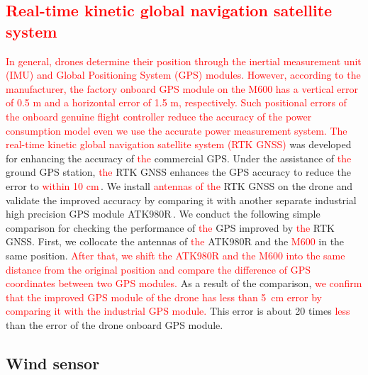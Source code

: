 \documentclass[journal]{./template/IEEEtran}
\begin{document}
\label{Section: Design the power measurement board}





\subsection{\textcolor{red}{Real-time kinetic global navigation satellite system}}
\textcolor{red}{In general, drones determine their position through the inertial measurement unit (IMU) and Global Positioning System (GPS) modules. 
However, according to the manufacturer, the factory onboard GPS module on the M600 has a vertical error of 0.5 m and a horizontal error of 1.5 m, respectively. 
Such positional errors of the onboard genuine flight controller reduce the accuracy of the power consumption model even we use the accurate power measurement system.}
\textcolor{red}{The real-time kinetic global navigation satellite system (RTK GNSS)} was developed for enhancing the accuracy of \textcolor{red}{the} commercial GPS.
Under the assistance of \textcolor{red}{the} ground GPS station, \textcolor{red}{the} RTK GNSS enhances the GPS accuracy to reduce the error to \textcolor{red}{within 10 cm}\,\cite{ref_13}.
We install \textcolor{red}{antennas of the} RTK GNSS on the drone and validate the improved accuracy by comparing it with another separate industrial high precision GPS module ATK980R\,\cite{ref_14}.
We conduct the following simple comparison for checking the performance of \textcolor{red}{the} GPS improved by \textcolor{red}{the} RTK GNSS.
First, we collocate the antennas of \textcolor{red}{the} ATK980R and the \textcolor{red}{M600} in the same position. 
\textcolor{red}{After that, we shift the ATK980R and the M600 into the same distance from the original position and compare the difference of GPS coordinates between two GPS modules.}
As a result of the comparison, \textcolor{red}{we confirm that the improved GPS module of the drone has less than 5~cm error by comparing it with the industrial GPS module.}
This error is about 20 times \textcolor{red}{less} than the error of the drone onboard GPS module.




\subsection{Wind sensor}
\end{document}
